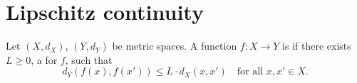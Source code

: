 
\section{Lipschitz continuity}
\label{sec:lipschitz_continuity}


\begin{definition}
\label{def:lipschitz_continuous}
Let $(X,d_X)$, $(Y,d_Y)$ be metric spaces. A function $f : X \to Y$ is   if there exists $L \geq 0$, a  for $f$, such that
\[d_Y(f(x),f(x')) \leq L\cdot d_X(x,x') \quad \text{for all } x,x' \in X.\]
\end{definition}

